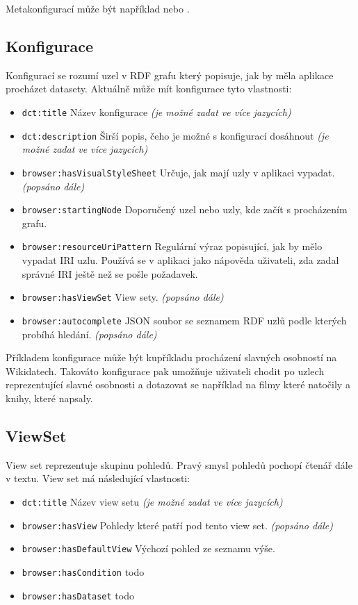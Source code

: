 Metakonfigurací může být například  nebo .

\subsection{Konfigurace} \label{pozadavky-konfigurace}
Konfigurací se rozumí uzel v RDF grafu který popisuje, jak by měla aplikace procházet datasety. Aktuálně může mít konfigurace tyto vlastnosti:

\begin{itemize}
    \item \texttt{dct:title} Název konfigurace \textit{(je možné zadat ve více jazycích)}
    \item \texttt{dct:description} Širší popis, čeho je možné s konfigurací dosáhnout \textit{(je možné zadat ve více jazycích)}
    \item \texttt{browser:hasVisualStyleSheet} Určuje, jak mají uzly v aplikaci vypadat. \textit{(popsáno dále)}
    \item \texttt{browser:startingNode} Doporučený uzel nebo uzly, kde začít s procházením grafu.
    \item \texttt{browser:resourceUriPattern} Regulární výraz popisující, jak by mělo vypadat IRI uzlu. Používá se v aplikaci jako nápověda uživateli, zda zadal správné IRI ještě než se pošle požadavek.
    \item \texttt{browser:hasViewSet} View sety. \textit{(popsáno dále)}
    \item \texttt{browser:autocomplete} JSON soubor se seznamem RDF uzlů podle kterých probíhá hledání. \textit{(popsáno dále)}
\end{itemize}

Příkladem konfigurace může být kupříkladu procházení slavných osobností na Wikidatech. Takováto konfigurace pak umožňuje uživateli chodit po uzlech reprezentující slavné osobnosti a dotazovat se například na filmy které natočily a knihy, které napsaly.

\subsection{ViewSet}
View set reprezentuje skupinu pohledů. Pravý smysl pohledů pochopí čtenář dále v textu. View set má následující vlastnosti:
\begin{itemize}
    \item \texttt{dct:title} Název view setu \textit{(je možné zadat ve více jazycích)}
    \item \texttt{browser:hasView} Pohledy které patří pod tento view set. \textit{(popsáno dále)}
    \item \texttt{browser:hasDefaultView} Výchozí pohled ze seznamu výše.
    \item \texttt{browser:hasCondition} todo
    \item \texttt{browser:hasDataset} todo
\end{itemize}


